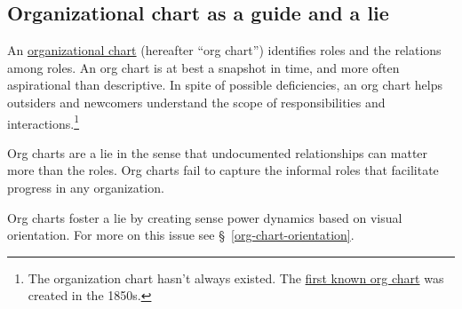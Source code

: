 \subsection{Organizational chart as a guide and a lie}

An \href{https://en.wikipedia.org/wiki/Organizational_chart}{organizational chart} (hereafter ``org chart'') identifies roles and the relations among roles. An org chart is at best a snapshot in time, and more often aspirational than descriptive. In spite of possible deficiencies, an org chart helps outsiders and newcomers understand the scope of responsibilities and interactions.\footnote{The organization chart hasn't always existed. The \href{https://en.wikipedia.org/wiki/George_Holt_Henshaw\#First_organization_chart}{first known org chart} was created in the 1850s.}

Org charts are a lie in the sense that undocumented relationships can matter more than the roles. Org charts fail to capture the informal roles that facilitate progress in any organization. 

Org charts foster a lie by creating sense power dynamics based on visual orientation. For more on this issue see \S~\ref{org-chart-orientation}.
